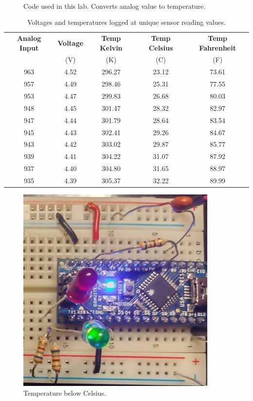 \documentclass{article}
\begin{document}
\paragraph{}

\paragraph{}

\begin{figure}[H]
	\caption{Code used in this lab. Converts analog value to temperature.}
\end{figure}


\begin{table}[H]
\begin{tabular}{ | c | c | c | c | c | }
	\hline
	\textbf{Analog Input} &
	\textbf{Voltage} &
	\textbf{Temp Kelvin} &
	\textbf{Temp Celsius} &
	\textbf{Temp Fahrenheit} \\
	& (V) & (K) & (C) & (F) \\
	\hline
	963 & 4.52 & 296.27 & 23.12 & 73.61 \\
	\hline
	957 & 4.49 & 298.46 & 25.31 & 77.55 \\
	\hline
	953 & 4.47 & 299.83 & 26.68 & 80.03 \\
	\hline
	948 & 4.45 & 301.47 & 28.32 & 82.97 \\
	\hline
	947 & 4.44 & 301.79 & 28.64 & 83.54 \\
	\hline
	945 & 4.43 & 302.41 & 29.26 & 84.67 \\
	\hline
	943 & 4.42 & 303.02 & 29.87 & 85.77 \\
	\hline
	939 & 4.41 & 304.22 & 31.07 & 87.92 \\
	\hline
	937 & 4.40 & 304.80 & 31.65 & 88.97 \\
	\hline
	935 & 4.39 & 305.37 & 32.22 & 89.99 \\
	\hline
\end{tabular}
\caption{\label{tab:table-name} Voltages and temperatures logged at unique sensor reading values.}
\end{table}

\begin{figure}[H]
	\includegraphics[width=10cm]{temp_below}
	\caption{Temperature below Celsius.}
\end{figure}
\end{document}
